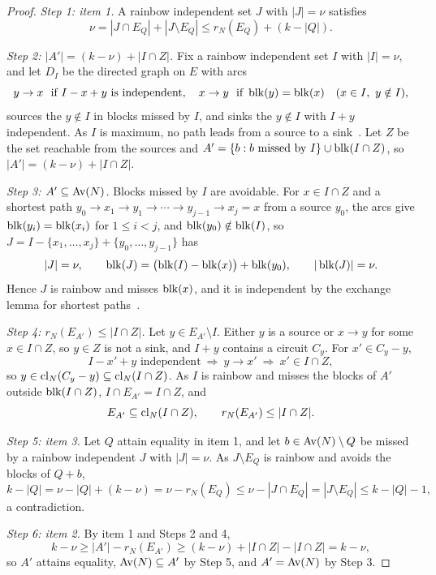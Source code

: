 \begin{proof}
\emph{Step 1: item 1.}  A rainbow independent set $J$ with $|J|=\nu$ satisfies
\[
  \nu=|J\cap E_Q|+|J\setminus E_Q|\le r_N(E_Q)+(k-|Q|).
\]

\emph{Step 2: $|A'|=(k-\nu)+|I\cap Z|$.}  Fix a rainbow independent set $I$ with
$|I|=\nu$, and let $D_I$ be the directed graph on $E$ with arcs
\[
  y\to x\ \ \text{if }I-x+y\text{ is independent},\quad
  x\to y\ \ \text{if }\operatorname{blk}(y)=\operatorname{blk}(x)\quad(x\in I,\ y\notin I),
\]
sources the $y\notin I$ in blocks missed by $I$, and sinks the $y\notin I$ with
$I+y$ independent.  As $I$ is maximum, no path leads from a source to a
sink~\cite{lawler75,schrijver03}.  Let $Z$ be the set reachable from the sources
and $A'=\{b:b\text{ missed by }I\}\cup\operatorname{blk}(I\cap Z)$, so
$|A'|=(k-\nu)+|I\cap Z|$.

\emph{Step 3: $A'\subseteq\operatorname{Av}(N)$.}  Blocks missed by $I$ are avoidable.  For
$x\in I\cap Z$ and a shortest path $y_0\to x_1\to y_1\to\cdots\to y_{j-1}\to x_j=x$
from a source $y_0$, the arcs give $\operatorname{blk}(y_i)=\operatorname{blk}(x_i)$ for $1\le i<j$, and
$\operatorname{blk}(y_0)\notin\operatorname{blk}(I)$, so $J=I-\{x_1,\ldots,x_j\}+\{y_0,\ldots,y_{j-1}\}$ has
\[
  |J|=\nu,\qquad\operatorname{blk}(J)=\bigl(\operatorname{blk}(I)-\operatorname{blk}(x)\bigr)+\operatorname{blk}(y_0),\qquad|\operatorname{blk}(J)|=\nu.
\]
Hence $J$ is rainbow and misses $\operatorname{blk}(x)$, and it is independent by the exchange
lemma for shortest paths~\cite{schrijver03}.

\emph{Step 4: $r_N(E_{A'})\le|I\cap Z|$.}  Let $y\in E_{A'}\setminus I$.  Either
$y$ is a source or $x\to y$ for some $x\in I\cap Z$, so $y\in Z$ is not a sink,
and $I+y$ contains a circuit $C_y$.  For $x'\in C_y-y$,
\[
  I-x'+y\text{ independent}\ \Rightarrow\ y\to x'\ \Rightarrow\ x'\in I\cap Z,
\]
so $y\in\operatorname{cl}_N(C_y-y)\subseteq\operatorname{cl}_N(I\cap Z)$.  As $I$ is rainbow and misses the
blocks of $A'$ outside $\operatorname{blk}(I\cap Z)$, $I\cap E_{A'}=I\cap Z$, and
\[
  E_{A'}\subseteq\operatorname{cl}_N(I\cap Z),\qquad r_N(E_{A'})\le|I\cap Z|.
\]

\emph{Step 5: item 3.}  Let $Q$ attain equality in item 1, and let
$b\in\operatorname{Av}(N)\setminus Q$ be missed by a rainbow independent $J$ with $|J|=\nu$.
As $J\setminus E_Q$ is rainbow and avoids the blocks of $Q+b$,
\[
  k-|Q|=\nu-|Q|+(k-\nu)=\nu-r_N(E_Q)\le\nu-|J\cap E_Q|=|J\setminus E_Q|\le k-|Q|-1,
\]
a contradiction.

\emph{Step 6: item 2.}  By item 1 and Steps 2 and 4,
\[
  k-\nu\ge|A'|-r_N(E_{A'})\ge(k-\nu)+|I\cap Z|-|I\cap Z|=k-\nu,
\]
so $A'$ attains equality, $\operatorname{Av}(N)\subseteq A'$ by Step 5, and $A'=\operatorname{Av}(N)$ by
Step 3.
\end{proof}

